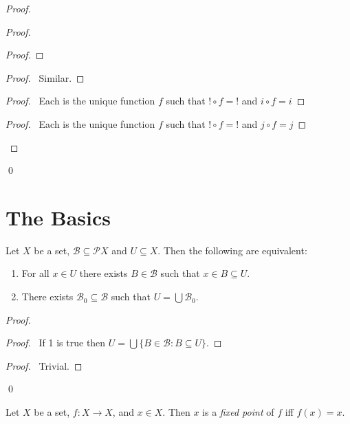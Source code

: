 \begin{proof}
\begin{proof}
\begin{proof}
  \end{proof}
  \begin{proof}
    \pf\ Similar.
  \end{proof}
  \begin{proof}
    \pf\ Each is the unique function $f$ such that $! \circ f = !$ and $i
\circ f = i$
\end{proof}
  \begin{proof}
    \pf\ Each is the unique function $f$ such that $! \circ f = !$ and $j
\circ f = j$
\end{proof}
\end{proof}
\qed
\end{proof}

\section{The Basics}


\begin{lm}
  \label{lm:set_theory:union_of_subsets}
  Let $X$ be a set, $\mathcal{B} \subseteq \mathcal{P} X$ and $U \subseteq
  X$. Then the following are equivalent:
  \begin{enumerate}
    \item For all $x \in U$ there exists $B \in \mathcal{B}$ such that $x \in
    B \subseteq U$.
    \item There exists $\mathcal{B}_0 \subseteq \mathcal{B}$ such that $U =
    \bigcup \mathcal{B}_0$.
  \end{enumerate}
\end{lm}

\begin{proof}
  \pf
  \begin{proof}
    \pf\ If 1 is true then $U = \bigcup \{ B \in \mathcal{B} : B \subseteq U
    \}$.
  \end{proof}
  \begin{proof}
    \pf\ Trivial.
  \end{proof}
  \qed
\end{proof}

\begin{df}
  Let $X$ be a set, $f : X \rightarrow X$, and $x \in X$. Then $x$ is a
  \emph{fixed point} of $f$ iff $f(x) = x$.
\end{df}

